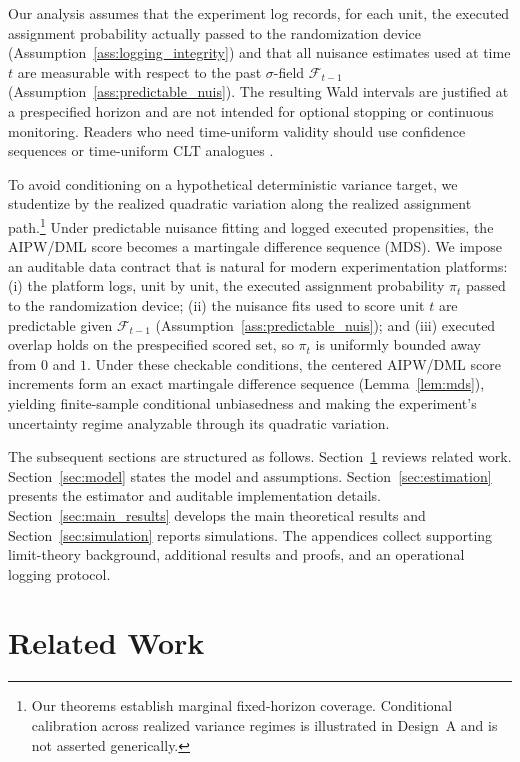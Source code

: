 \documentclass[11pt]{article}
\numberwithin{equation}{section}
\theoremstyle{plain}
\theoremstyle{definition}
\theoremstyle{remark}
\newcommand{\cF}{\mathcal{F}}
\begin{document}
Our analysis assumes that the experiment log records, for each unit, the executed assignment probability actually passed to the randomization device (Assumption~\ref{ass:logging_integrity}) and that all nuisance estimates used at time $t$ are measurable with respect to the past $\sigma$-field $\cF_{t-1}$ (Assumption~\ref{ass:predictable_nuis}). The resulting Wald intervals are justified at a prespecified horizon and are not intended for optional stopping or continuous monitoring. Readers who need time-uniform validity should use confidence sequences or time-uniform CLT analogues \citep{howard2021confidence,waudby2024timeuniform}.

To avoid conditioning on a hypothetical deterministic variance target, we studentize by the realized quadratic variation along the realized assignment path.\footnote{Our theorems establish marginal fixed-horizon coverage. Conditional calibration across realized variance regimes is illustrated in Design~A and is not asserted generically.} Under predictable nuisance fitting and logged executed propensities, the AIPW/DML score becomes a martingale difference sequence (MDS). We impose an auditable data contract that is natural for modern experimentation platforms: (i) the platform logs, unit by unit, the executed assignment probability $\pi_t$ passed to the randomization device; (ii) the nuisance fits used to score unit $t$ are predictable given $\cF_{t-1}$ (Assumption~\ref{ass:predictable_nuis}); and (iii) executed overlap holds on the prespecified scored set, so $\pi_t$ is uniformly bounded away from $0$ and $1$. Under these checkable conditions, the centered AIPW/DML score increments form an exact martingale difference sequence (Lemma~\ref{lem:mds}), yielding finite-sample conditional unbiasedness and making the experiment's uncertainty regime analyzable through its quadratic variation.

The subsequent sections are structured as follows. Section~\ref{sec:related} reviews related work. Section~\ref{sec:model} states the model and assumptions. Section~\ref{sec:estimation} presents the estimator and auditable implementation details. Section~\ref{sec:main_results} develops the main theoretical results and Section~\ref{sec:simulation} reports simulations. The appendices collect supporting limit-theory background, additional results and proofs, and an operational logging protocol.
\section{Related Work}\label{sec:related}
\end{document}
